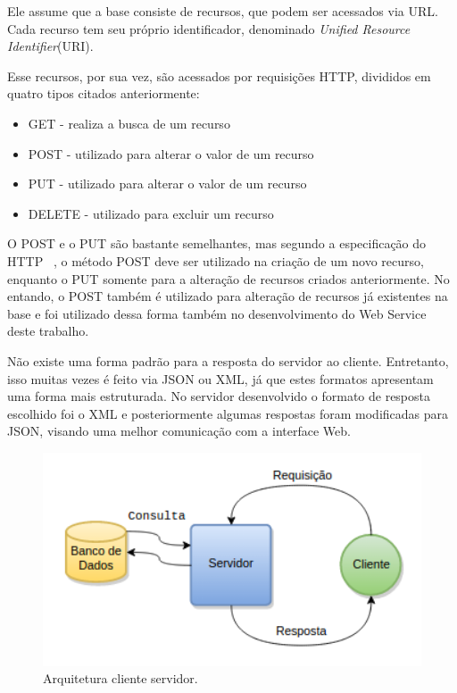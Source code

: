 Ele assume que a base consiste de recursos, que podem ser acessados via URL. Cada recurso tem seu próprio identificador, denominado \textit{Unified Resource Identifier}(URI).


Esse recursos, por sua vez, são acessados por requisições HTTP, divididos em quatro tipos citados anteriormente:

\begin{itemize}
\item GET - realiza a busca de um recurso
\item POST - utilizado para alterar o valor de um recurso
\item PUT - utilizado para alterar o valor de um recurso
\item DELETE - utilizado para excluir um recurso
\end{itemize}

O POST e o PUT são bastante semelhantes, mas segundo a especificação do HTTP ~\cite{RFC2616}, o método POST deve ser utilizado na criação de um novo recurso, enquanto o PUT somente para a alteração de recursos criados anteriormente. No entando, o POST também é utilizado para alteração de recursos já existentes na base e foi utilizado dessa forma também no desenvolvimento do Web Service deste trabalho.

Não existe uma forma padrão para a resposta do servidor ao cliente. Entretanto, isso muitas vezes é feito via JSON ou XML, já que estes formatos apresentam uma forma mais estruturada. No servidor desenvolvido o formato de resposta escolhido foi o XML e posteriormente algumas respostas foram modificadas para JSON, visando uma melhor comunicação com a interface Web.

\begin{figure}[clientserver]
\centering
\includegraphics[width=1.0\textwidth]{figs/clientserver}
\caption[Arquitetura cliente servidor.]
{Arquitetura cliente servidor.}
\label{fig:clientserver}
\end{figure}


